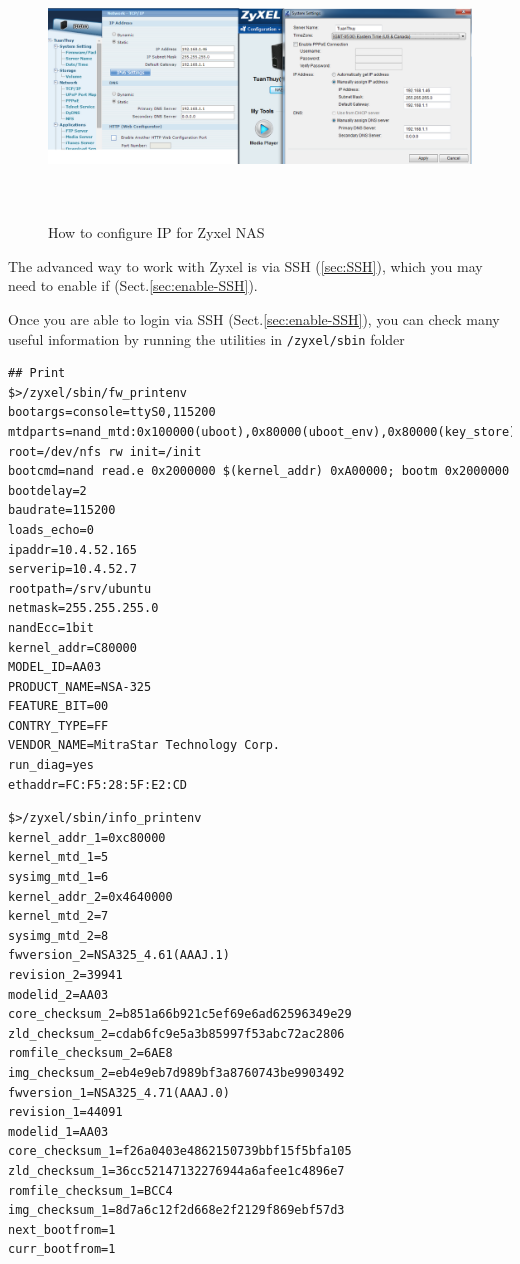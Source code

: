 \begin{figure}[hbt]
  \centerline{\includegraphics[height=7cm,
    angle=0]{./images/Zyxel-NAS-network.eps}}
\caption{How to configure IP for Zyxel NAS}
\label{fig:Zyxel-NAS-network}
\end{figure}


The advanced way to work with Zyxel is via SSH (\ref{sec:SSH}), 
which you may need to enable if (Sect.\ref{sec:enable-SSH}).

Once you are able to login via SSH (Sect.\ref{sec:enable-SSH}), you can check 
many useful information by running the utilities in \verb!/zyxel/sbin! folder

\begin{verbatim}
## Print 
$>/zyxel/sbin/fw_printenv
bootargs=console=ttyS0,115200 mtdparts=nand_mtd:0x100000(uboot),0x80000(uboot_env),0x80000(key_store),0x80000(info),0xA00000(etc),0xA00000(kernel_1),0x2FC0000(rootfs1),0xA00000(kernel_2),0x2FC0000(rootfs2) root=/dev/nfs rw init=/init
bootcmd=nand read.e 0x2000000 $(kernel_addr) 0xA00000; bootm 0x2000000
bootdelay=2
baudrate=115200
loads_echo=0
ipaddr=10.4.52.165
serverip=10.4.52.7
rootpath=/srv/ubuntu
netmask=255.255.255.0
nandEcc=1bit
kernel_addr=C80000
MODEL_ID=AA03
PRODUCT_NAME=NSA-325
FEATURE_BIT=00
CONTRY_TYPE=FF
VENDOR_NAME=MitraStar Technology Corp.
run_diag=yes
ethaddr=FC:F5:28:5F:E2:CD
\end{verbatim}

\begin{verbatim}
$>/zyxel/sbin/info_printenv
kernel_addr_1=0xc80000
kernel_mtd_1=5
sysimg_mtd_1=6
kernel_addr_2=0x4640000
kernel_mtd_2=7
sysimg_mtd_2=8
fwversion_2=NSA325_4.61(AAAJ.1)
revision_2=39941
modelid_2=AA03
core_checksum_2=b851a66b921c5ef69e6ad62596349e29
zld_checksum_2=cdab6fc9e5a3b85997f53abc72ac2806
romfile_checksum_2=6AE8
img_checksum_2=eb4e9eb7d989bf3a8760743be9903492
fwversion_1=NSA325_4.71(AAAJ.0)
revision_1=44091
modelid_1=AA03
core_checksum_1=f26a0403e4862150739bbf15f5bfa105
zld_checksum_1=36cc52147132276944a6afee1c4896e7
romfile_checksum_1=BCC4
img_checksum_1=8d7a6c12f2d668e2f2129f869ebf57d3
next_bootfrom=1
curr_bootfrom=1
\end{verbatim}

